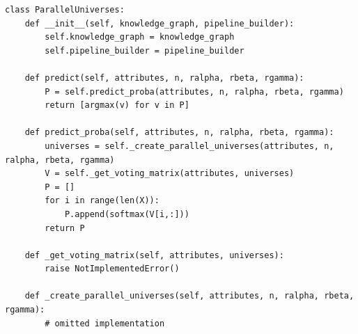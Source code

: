 \begin{lstlisting}[caption= Modelo base de universos paralelos, label = code:lp-pu]
class ParallelUniverses:
    def __init__(self, knowledge_graph, pipeline_builder):
        self.knowledge_graph = knowledge_graph
        self.pipeline_builder = pipeline_builder

    def predict(self, attributes, n, ralpha, rbeta, rgamma):
        P = self.predict_proba(attributes, n, ralpha, rbeta, rgamma)
        return [argmax(v) for v in P]

    def predict_proba(self, attributes, n, ralpha, rbeta, rgamma):
        universes = self._create_parallel_universes(attributes, n, ralpha, rbeta, rgamma)
        V = self._get_voting_matrix(attributes, universes)
        P = []
        for i in range(len(X)):
            P.append(softmax(V[i,:]))
        return P

    def _get_voting_matrix(self, attributes, universes):
        raise NotImplementedError()

    def _create_parallel_universes(self, attributes, n, ralpha, rbeta, rgamma):
        # omitted implementation
\end{lstlisting}









